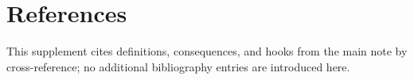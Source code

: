 \section{References}
\begingroup\small This supplement cites definitions, consequences, and hooks from the main note by cross-reference; no additional bibliography entries are introduced here.\endgroup
